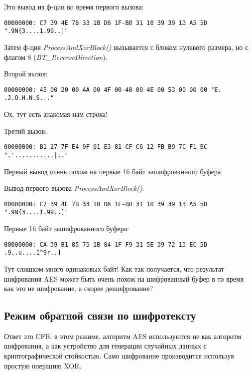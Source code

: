 Это вывод из ф-ции во время первого вызова:

\begin{lstlisting}
00000000: C7 39 4E 7B 33 1B D6 1F-B8 31 10 39 39 13 A5 5D ".9N{3....1.99..]"
\end{lstlisting}

Затем ф-ция \emph{ProcessAndXorBlock()} вызывается с блоком нулевого размера, но с флагом 8 (\emph{BT\_ReverseDirection}).

Второй вызов:

\begin{lstlisting}
00000000: 45 00 20 00 4A 00 4F 00-48 00 4E 00 53 00 00 00 "E. .J.O.H.N.S..."
\end{lstlisting}

Ох, тут есть знакомая нам строка!

Третий вызов:

\begin{lstlisting}
00000000: B1 27 7F E4 9F 01 E3 81-CF C6 12 FB B9 7C F1 BC ".'...........|.."
\end{lstlisting}

Первый вывод очень похож на первые 16 байт зашифрованного буфера.

Вывод первого вызова \emph{ProcessAndXorBlock()}:

\begin{lstlisting}
00000000: C7 39 4E 7B 33 1B D6 1F-B8 31 10 39 39 13 A5 5D ".9N{3....1.99..]"
\end{lstlisting}

Первые 16 байт зашифрованного буфера:

\begin{lstlisting}
00000000: CA 39 B1 85 75 1B 84 1F F9 31 5E 39 72 13 EC 5D  .9..u....1^9r..]
\end{lstlisting}

Тут слишком много одинаковых байт!
Как так получается, что результат шифрования AES может быть очень похож на шифрованный буфер в то время как это
не шифрование, а скорее дешифрование?

\subsection{Режим обратной связи по шифротексту}

Ответ это \ac{CFB}:
в этом режиме, алгоритм AES используются не как алгоритм шифрования, а как устройство для генерации случайных данных
с криптографической стойкостью.
Само шифрование производится используя простую операцию XOR.

